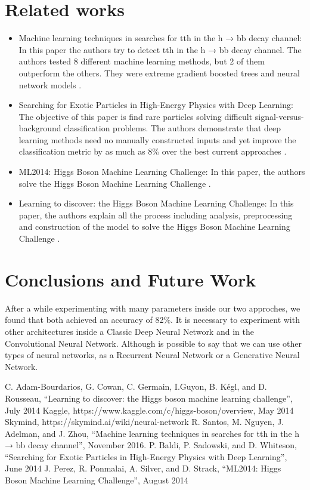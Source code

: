 \documentclass[conference]{IEEEtran}
\begin{document}
\section{Related works}
\begin{itemize}
\item Machine learning techniques in searches for tth in the h → bb decay channel: In this paper the authors try to detect tth in the h → bb decay channel. The authors tested 8 different machine learning methods, but 2 of them outperform the others. They were extreme gradient boosted trees and neural network models \cite{b4}.\newline
\item Searching for Exotic Particles in High-Energy Physics with Deep Learning: The objective of this paper is find rare particles solving difficult signal-versus-background classification problems. The authors demonstrate that deep learning methods need no manually constructed inputs and yet improve the classification metric by as much as 8\% over the best current approaches \cite{b5}.\newline
\item  ML2014: Higgs Boson Machine Learning Challenge: In this paper, the authors solve the Higgs Boson Machine Learning Challenge \cite{b6}.\newline
\item Learning to discover: the Higgs Boson Machine Learning Challenge: In this paper, the authors explain all the process including analysis, preprocessing and construction of the model to solve the Higgs Boson Machine Learning Challenge \cite{b1}.
\end{itemize} 

\section{Conclusions and Future Work}
After a while experimenting with many parameters inside our two approches, we found that both achieved an accuracy of 82\%. It is necessary to experiment with other architectures inside a Classic Deep Neural Network and in the Convolutional Neural Network. Although is possible to say that we can use other types of neural networks, as a Recurrent Neural Network or a Generative Neural Network.


\begin{thebibliography}{00}
 C. Adam-Bourdarios, G. Cowan, C. Germain, I.Guyon, B. Kégl, and D. Rousseau, ``Learning to discover: the Higgs boson machine learning challenge'', July 2014
 Kaggle, https://www.kaggle.com/c/higgs-boson/overview, May 2014
 Skymind, https://skymind.ai/wiki/neural-network
 R. Santos, M. Nguyen, J. Adelman, and J. Zhou, ``Machine learning techniques in searches for tth in the h → bb decay channel'', November 2016.
 P. Baldi, P. Sadowski, and D. Whiteson, ``Searching for Exotic Particles in High-Energy Physics with Deep Learning'', June 2014
 J. Perez, R. Ponmalai, A. Silver, and D. Strack, ``ML2014: Higgs Boson Machine Learning Challenge'', August 2014
\end{thebibliography}
\vspace{12pt}
\color{red}
\end{document}
